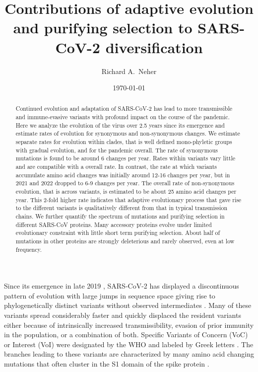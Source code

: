 \documentclass[aps,rmp, twocolumn]{revtex4}
\begin{document}
\title{Contributions of adaptive evolution and purifying selection to SARS-CoV-2 diversification}
\author{Richard A.~Neher}
\address{Biozentrum, University of Basel, Basel, Switzerland }
\address{Swiss Institute of Bioinformatics, Switzerland }

\date{\today}

\begin{abstract}
Continued evolution and adaptation of SARS-CoV-2 has lead to more transmissible and immune-evasive variants with profound impact on the course of the pandemic.
Here we analyze the evolution of the virus over 2.5 years since its emergence and estimate rates of evolution for synonymous and non-synonymous changes.
We estimate separate rates for evolution within clades, that is well defined mono-phyletic groups with gradual evolution, and for the pandemic overall.
The rate of synonymous mutations is found to be around 6 changes per year.
Rates within variants vary little and are compatible with a overall rate.
In contrast, the rate at which variants accumulate amino acid changes was initially around 12-16 changes per year, but in 2021 and 2022 dropped to 6-9 changes per year.
The overall rate of non-synonymous evolution, that is across variants, is estimated to be about 25 amino acid changes per year.
This 2-fold higher rate indicates that adaptive evolutionary process that gave rise to the different variants is qualitatively different from that in typical transmission chains.
We further quantify the spectrum of mutations and purifying selection in different SARS-CoV proteins.
Many accessory proteins evolve under limited evolutionary constraint with little short term purifying selection.
About half of mutations in other proteins are strongly deleterious and rarely observed, even at low frequency.
\end{abstract}

\maketitle

Since its emergence in late 2019 \citep{zhu_novel_2020}, SARS-CoV-2 has displayed a discontinuous pattern of evolution with large jumps in sequence space giving rise to phylogenetically distinct variants without observed intermediates \citep{hodcroft_spread_2021,volz_assessing_2021,tegally_detection_2021,faria_genomics_2021,naveca_covid-19_2021,viana_rapid_2022}.
Many of these variants spread considerably faster and quickly displaced the resident variants either because of intrinsically increased transmissibility, evasion of prior immunity in the population, or a combination of both.
Specific Variants of Concern (VoC) or Interest (VoI) were designated by the WHO and labeled by Greek letters \citep{konings_sars-cov-2_2021}.
The branches leading to these variants are characterized by many amino acid changing mutations that often cluster in the S1 domain of the spike protein \citep{kistler_rapid_2022}.
\end{document}
